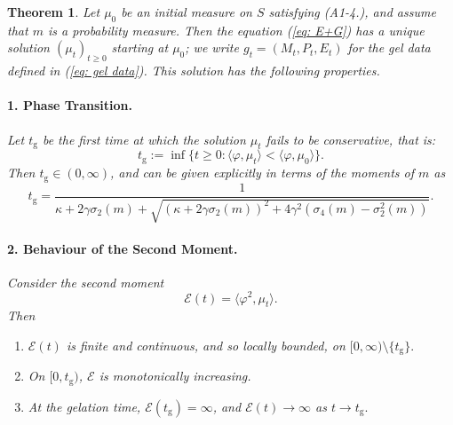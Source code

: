 \documentclass[11pt, notitlepage]{article}
\newtheorem{thm}{Theorem}[section]
\begin{document}
\begin{thm}\label{thrm: Smoluchowski equation}
Let $\mu_0$ be an initial measure on $S$ satisfying ({A1-4}.), and assume that $m$ is a probability measure. Then the equation (\ref{eq: E+G}) has a unique solution $(\mu_t)_{t\geq 0}$ starting at $\mu_0$; we write $g_t=(M_t, P_t, E_t)$ for the gel data defined in (\ref{eq: gel data}). This solution has the following properties.
\paragraph{\textbf{1. Phase Transition.}} Let $t_\mathrm{g}$ be the first time at which the solution $\mu_t$ fails to be conservative, that is:
\begin{equation} t_\mathrm{g}:=\inf\{t\ge 0: \langle \varphi, \mu_t\rangle < \langle \varphi, \mu_0\rangle \}.
\end{equation}
Then
$t_\mathrm{g}\in (0,\infty)$, and can be given explicitly in terms of the moments of $m$ as \begin{equation}\label{eq: closed form for tg}
       t_\mathrm{g}= \frac{1}{\kappa +2\gamma\sigma_2(m) + \sqrt{(\kappa+2\gamma\sigma_2(m))^2+4\gamma^2(\sigma_4(m)-\sigma_2^2(m))}}.
   \end{equation}

\paragraph{\textbf{2. Behaviour of the Second Moment.}} Consider the second moment
\begin{equation} \mathcal{E}(t)=\langle \varphi^2, \mu_t\rangle.
\end{equation}
Then \begin{enumerate}[label=\roman{*}).]
    \item $\mathcal{E}(t)$ is finite and continuous, and so locally bounded, on $[0, \infty)\setminus\{t_\mathrm{g}\}.$ 

    \item On $[0, t_\mathrm{g})$, $\mathcal{E}$ is monotonically increasing.
    
    \item At the gelation time, $\mathcal{E}(t_\mathrm{g})=\infty$, and $\mathcal{E}(t)\rightarrow \infty$ as $t\rightarrow t_\mathrm{g}.$ 
\end{enumerate}



\end{thm}
\end{document}
